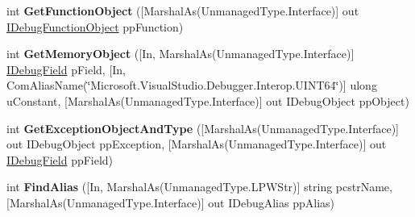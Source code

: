 \begin{DoxyCompactItemize}
\item 
\hypertarget{interface_microsoft_1_1_visual_studio_1_1_debugger_1_1_interop_e_e_1_1_i_debug_binder3_ad3430292dbf84b2b945ca429cd4a1208}{int {\bfseries Get\+Function\+Object} (\mbox{[}Marshal\+As(Unmanaged\+Type.\+Interface)\mbox{]} out \hyperlink{interface_microsoft_1_1_visual_studio_1_1_debugger_1_1_interop_e_e_1_1_i_debug_function_object}{I\+Debug\+Function\+Object} pp\+Function)}\label{interface_microsoft_1_1_visual_studio_1_1_debugger_1_1_interop_e_e_1_1_i_debug_binder3_ad3430292dbf84b2b945ca429cd4a1208}

\item 
\hypertarget{interface_microsoft_1_1_visual_studio_1_1_debugger_1_1_interop_e_e_1_1_i_debug_binder3_a351ff843a8268be694164bfd902c48f1}{int {\bfseries Get\+Memory\+Object} (\mbox{[}In, Marshal\+As(Unmanaged\+Type.\+Interface)\mbox{]} \hyperlink{interface_microsoft_1_1_visual_studio_1_1_debugger_1_1_interop_e_e_1_1_i_debug_field}{I\+Debug\+Field} p\+Field, \mbox{[}In, Com\+Alias\+Name(\char`\"{}Microsoft.\+Visual\+Studio.\+Debugger.\+Interop.\+U\+I\+N\+T64\char`\"{})\mbox{]} ulong u\+Constant, \mbox{[}Marshal\+As(Unmanaged\+Type.\+Interface)\mbox{]} out I\+Debug\+Object pp\+Object)}\label{interface_microsoft_1_1_visual_studio_1_1_debugger_1_1_interop_e_e_1_1_i_debug_binder3_a351ff843a8268be694164bfd902c48f1}

\item 
\hypertarget{interface_microsoft_1_1_visual_studio_1_1_debugger_1_1_interop_e_e_1_1_i_debug_binder3_a6d067d0f25ae8b1d6028436e7e1862e6}{int {\bfseries Get\+Exception\+Object\+And\+Type} (\mbox{[}Marshal\+As(Unmanaged\+Type.\+Interface)\mbox{]} out I\+Debug\+Object pp\+Exception, \mbox{[}Marshal\+As(Unmanaged\+Type.\+Interface)\mbox{]} out \hyperlink{interface_microsoft_1_1_visual_studio_1_1_debugger_1_1_interop_e_e_1_1_i_debug_field}{I\+Debug\+Field} pp\+Field)}\label{interface_microsoft_1_1_visual_studio_1_1_debugger_1_1_interop_e_e_1_1_i_debug_binder3_a6d067d0f25ae8b1d6028436e7e1862e6}

\item 
\hypertarget{interface_microsoft_1_1_visual_studio_1_1_debugger_1_1_interop_e_e_1_1_i_debug_binder3_a0353397eb280c701db4c3b7ca671e052}{int {\bfseries Find\+Alias} (\mbox{[}In, Marshal\+As(Unmanaged\+Type.\+L\+P\+W\+Str)\mbox{]} string pcstr\+Name, \mbox{[}Marshal\+As(Unmanaged\+Type.\+Interface)\mbox{]} out I\+Debug\+Alias pp\+Alias)}\label{interface_microsoft_1_1_visual_studio_1_1_debugger_1_1_interop_e_e_1_1_i_debug_binder3_a0353397eb280c701db4c3b7ca671e052}


\end{DoxyCompactItemize}

